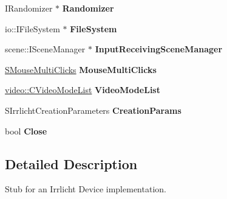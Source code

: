 \begin{DoxyCompactItemize}
\item 
\hypertarget{classirr_1_1_c_irr_device_stub_ad7672d60e8e7335957ddc774ce907420}{I\-Randomizer $\ast$ {\bfseries Randomizer}}\label{classirr_1_1_c_irr_device_stub_ad7672d60e8e7335957ddc774ce907420}

\item 
\hypertarget{classirr_1_1_c_irr_device_stub_aa8d55465a4606c5208decb4fc65cd45a}{io\-::\-I\-File\-System $\ast$ {\bfseries File\-System}}\label{classirr_1_1_c_irr_device_stub_aa8d55465a4606c5208decb4fc65cd45a}

\item 
\hypertarget{classirr_1_1_c_irr_device_stub_a681baa7abadc25de5f10b884799dc87a}{scene\-::\-I\-Scene\-Manager $\ast$ {\bfseries Input\-Receiving\-Scene\-Manager}}\label{classirr_1_1_c_irr_device_stub_a681baa7abadc25de5f10b884799dc87a}

\item 
\hypertarget{classirr_1_1_c_irr_device_stub_a8733404e97a322c59762e46894415e58}{\hyperlink{structirr_1_1_c_irr_device_stub_1_1_s_mouse_multi_clicks}{S\-Mouse\-Multi\-Clicks} {\bfseries Mouse\-Multi\-Clicks}}\label{classirr_1_1_c_irr_device_stub_a8733404e97a322c59762e46894415e58}

\item 
\hypertarget{classirr_1_1_c_irr_device_stub_aa306834e879a5b5987b96ea469f266df}{\hyperlink{classirr_1_1video_1_1_c_video_mode_list}{video\-::\-C\-Video\-Mode\-List} {\bfseries Video\-Mode\-List}}\label{classirr_1_1_c_irr_device_stub_aa306834e879a5b5987b96ea469f266df}

\item 
\hypertarget{classirr_1_1_c_irr_device_stub_a952ce868f865af7907f47305a8c3f252}{S\-Irrlicht\-Creation\-Parameters {\bfseries Creation\-Params}}\label{classirr_1_1_c_irr_device_stub_a952ce868f865af7907f47305a8c3f252}

\item 
\hypertarget{classirr_1_1_c_irr_device_stub_a89a46394dc0f28f4426ccc561b9b94e2}{bool {\bfseries Close}}\label{classirr_1_1_c_irr_device_stub_a89a46394dc0f28f4426ccc561b9b94e2}

\end{DoxyCompactItemize}


\subsection{Detailed Description}
Stub for an Irrlicht Device implementation. 

